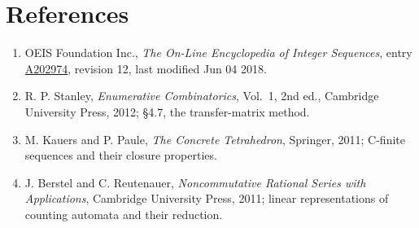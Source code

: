 \documentclass[11pt]{article}
\theoremstyle{definition}
\begin{document}
\section{References}

\begin{enumerate}

\item OEIS Foundation Inc., \emph{The On-Line Encyclopedia of Integer Sequences}, entry \href{https://oeis.org/A202974}{A202974}, revision 12, last modified Jun 04 2018.

\item R. P. Stanley, \emph{Enumerative Combinatorics}, Vol.~1, 2nd ed., Cambridge University Press, 2012; \S4.7, the transfer-matrix method.

\item M. Kauers and P. Paule, \emph{The Concrete Tetrahedron}, Springer, 2011; C-finite sequences and their closure properties.

\item J. Berstel and C. Reutenauer, \emph{Noncommutative Rational Series with Applications}, Cambridge University Press, 2011; linear representations of counting automata and their reduction.

\end{enumerate}
\end{document}
